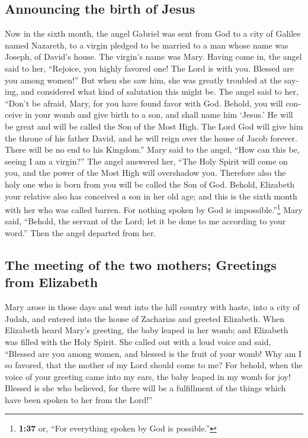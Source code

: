 \begin{paracol}{2}
\begin{otherlanguage}{english}
\hypertarget{announcing-the-birth-of-jesus}{%
\subsection{Announcing the birth of
Jesus}\label{announcing-the-birth-of-jesus}}

 Now in the sixth month, the angel Gabriel was sent from
God to a city of Galilee named Nazareth,  to a virgin
pledged to be married to a man whose name was Joseph, of David's house.
The virgin's name was Mary.  Having come in, the angel
said to her, ``Rejoice, you highly favored one! The Lord is with you.
Blessed are you among women!''  But when she saw him, she
was greatly troubled at the saying, and considered what kind of
salutation this might be.  The angel said to her, ``Don't
be afraid, Mary, for you have found favor with God. 
Behold, you will conceive in your womb and give birth to a son, and
shall name him `Jesus.'  He will be great and will be
called the Son of the Most High. The Lord God will give him the throne
of his father David,  and he will reign over the house of
Jacob forever. There will be no end to his Kingdom.'' 
Mary said to the angel, ``How can this be, seeing I am a virgin?''
 The angel answered her, ``The Holy Spirit will come on
you, and the power of the Most High will overshadow you. Therefore also
the holy one who is born from you will be called the Son of God.
 Behold, Elizabeth your relative also has conceived a son
in her old age; and this is the sixth month with her who was called
barren.  For nothing spoken by God is
impossible.''\footnote{\textbf{1:37} or, ``For everything spoken by God
  is possible.''}  Mary said, ``Behold, the servant of
the Lord; let it be done to me according to your word.'' Then the angel
departed from her.

\hypertarget{the-meeting-of-the-two-mothers-greetings-from-elizabeth}{%
\subsection{The meeting of the two mothers; Greetings from
Elizabeth}\label{the-meeting-of-the-two-mothers-greetings-from-elizabeth}}

 Mary arose in those days and went into the hill country
with haste, into a city of Judah,  and entered into the
house of Zacharias and greeted Elizabeth.  When Elizabeth
heard Mary's greeting, the baby leaped in her womb; and Elizabeth was
filled with the Holy Spirit.  She called out with a loud
voice and said, ``Blessed are you among women, and blessed is the fruit
of your womb!  Why am I so favored, that the mother of my
Lord should come to me?  For behold, when the voice of
your greeting came into my ears, the baby leaped in my womb for joy!
 Blessed is she who believed, for there will be a
fulfillment of the things which have been spoken to her from the Lord!''


\end{otherlanguage}
\end{paracol}
